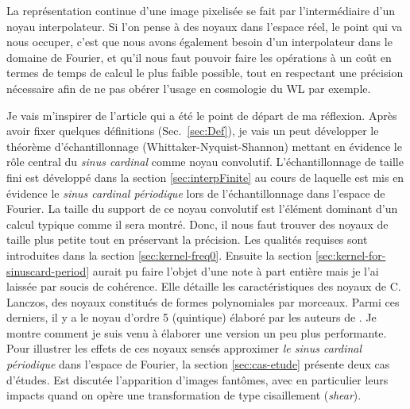 \documentclass[11pt,twoside]{article}
\begin{document}
La représentation continue d'une image pixelisée se fait par l'intermédiaire d'un noyau interpolateur. Si l'on pense à des noyaux dans l'espace réel, le point qui va nous occuper, c'est que nous avons également besoin d'un interpolateur dans le domaine de Fourier, et qu'il nous faut pouvoir faire les opérations à un coût en termes de temps de calcul le plus faible possible, tout en respectant une précision nécessaire afin de ne pas obérer l'usage en cosmologie du WL par exemple. 

Je vais m'inspirer de l'article \cite{2014PASP..126..287B} qui a été le point de départ de ma réflexion. Après avoir fixer quelques définitions (Sec.~\ref{sec:Def}), je vais un peut développer le théorème d'échantillonnage (Whittaker-Nyquist-Shannon) mettant en évidence le rôle central du \textit{sinus cardinal} comme noyau convolutif. L'échantillonnage de taille fini est développé dans la section \ref{sec:interpFinite} au cours de laquelle est mis en évidence le \textit{sinus cardinal périodique}  lors de l'échantillonnage dans l'espace de Fourier. La taille du support de ce noyau convolutif est l'élément dominant d'un calcul typique comme il sera montré. Donc, il nous faut trouver des noyaux de taille plus petite tout en préservant la précision. Les qualités requises sont introduites dans la section \ref{sec:kernel-freq0}. Ensuite la section \ref{sec:kernel-for-sinuscard-period} aurait pu faire l'objet d'une note à part entière mais je l'ai laissée par soucis de cohérence. Elle détaille les caractéristiques des noyaux de C. Lanczos, des noyaux constitués de formes polynomiales par morceaux. Parmi ces derniers, il y a le noyau d'ordre 5 (quintique) élaboré par les auteurs de \cite{2014PASP..126..287B}. Je montre comment je suis venu à élaborer une version un peu plus performante. Pour illustrer les effets de ces noyaux sensés approximer \textit{le sinus cardinal périodique} dans l'espace de Fourier, la section \ref{sec:cas-etude} présente deux cas d'études. Est discutée l'apparition d'images fantômes,  avec en particulier leurs impacts quand on opère une transformation de type cisaillement (\textit{shear}). 
%
\end{document}

